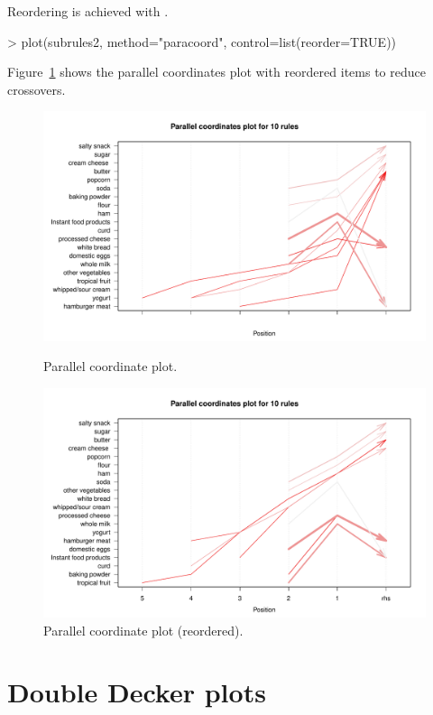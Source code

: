 \documentclass[nojss]{jss}
\begin{document}
Reordering is achieved with .
\begin{Schunk}
\begin{Sinput}
> plot(subrules2, method="paracoord", control=list(reorder=TRUE))
\end{Sinput}
\end{Schunk}

Figure~\ref{fig:pc2}
shows the parallel coordinates plot with reordered items
to reduce crossovers.

\begin{figure}
\centering
\includegraphics[width=15cm]{arulesViz-pc1}
\caption{Parallel coordinate plot.\label{fig:pc1}}

\includegraphics[width=15cm]{arulesViz-pc2}
\caption{Parallel coordinate plot (reordered).\label{fig:pc2}}
\end{figure}

\section{Double Decker plots}
\label{sec:doubledecker}
\end{document}
